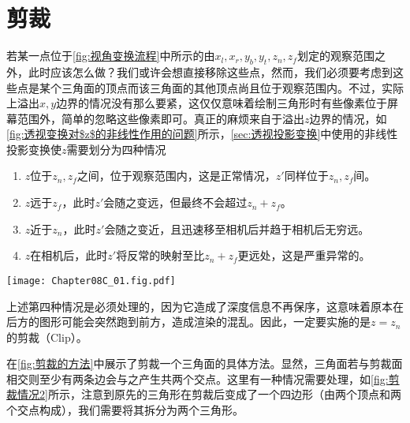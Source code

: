 \section{剪裁}

若某一点位于\cref{fig:视角变换流程}中所示的由$x_l,x_r,y_b,y_t,z_n,z_f$划定的观察范围之外，此时应该怎么做？我们或许会想直接移除这些点，然而，我们必须要考虑到这些点是某个三角面的顶点而该三角面的其他顶点尚且位于观察范围内。不过，实际上溢出$x,y$边界的情况没有那么要紧，这仅仅意味着绘制三角形时有些像素位于屏幕范围外，简单的忽略这些像素即可。真正的麻烦来自于溢出$z$边界的情况，如\cref{fig:透视变换对$z$的非线性作用的问题}所示，\cref{sec:透视投影变换}中使用的非线性投影变换使$z$需要划分为四种情况
\begin{enumerate}
    \item $z$位于$z_n,z_f$之间，位于观察范围内，这是正常情况，$z'$同样位于$z_n,z_f$间。
    \item $z$远于$z_f$，此时$z'$会随之变远，但最终不会超过$z_n+z_f$。
    \item $z$近于$z_n$，此时$z'$会随之变近，且迅速移至相机后并趋于相机后无穷远。
    \item $z$在相机后，此时$z'$将反常的映射至比$z_n+z_f$更远处，这是严重异常的。
\end{enumerate}

\begin{Figure}
    \texttt{[image: Chapter08C\_01.fig.pdf]}
\end{Figure}


上述第四种情况是必须处理的，因为它造成了深度信息不再保序，这意味着原本在后方的图形可能会突然跑到前方，造成渲染的混乱。因此，一定要实施的是$z=z_n$的剪裁（Clip）。

在\cref{fig:剪裁的方法}中展示了剪裁一个三角面的具体方法。显然，三角面若与剪裁面相交则至少有两条边会与之产生共两个交点。这里有一种情况需要处理，如\cref{fig:剪裁情况2}所示，注意到原先的三角形在剪裁后变成了一个四边形（由两个顶点和两个交点构成），我们需要将其拆分为两个三角形。

\begin{Figure}[剪裁的方法]
\end{Figure}